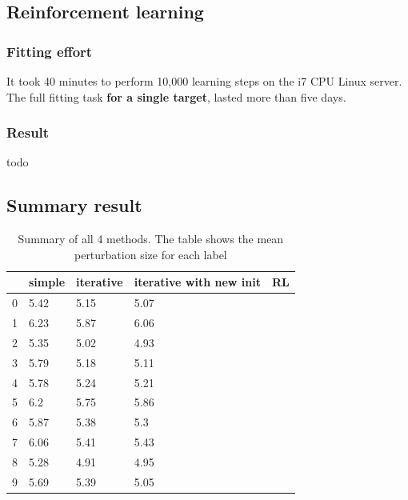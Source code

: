 \documentclass{article}
\begin{document}
\clearpage
\subsection{Reinforcement learning}

\subsubsection{Fitting effort}
It took 40 minutes to perform 10,000 learning steps on the i7 CPU Linux server.
The full fitting task \textbf{for a single target}, lasted more than five days.

\subsubsection{Result}
todo

\subsection{Summary result}

\begin{table}[h]
\caption{Summary of all 4 methods. The table shows the mean perturbation size for each label}
\label{tab:summary}
\begin{tabular}{|l|l|l|l|l|}
\hline
  & simple & iterative & iterative with new init & RL \\ \hline
0 & 5.42   & 5.15      & 5.07                    &    \\ \hline
1 & 6.23   & 5.87      & 6.06                    &    \\ \hline
2 & 5.35   & 5.02      & 4.93                    &    \\ \hline
3 & 5.79   & 5.18      & 5.11                    &    \\ \hline
4 & 5.78   & 5.24      & 5.21                    &    \\ \hline
5 & 6.2    & 5.75      & 5.86                    &    \\ \hline
6 & 5.87   & 5.38      & 5.3                     &    \\ \hline
7 & 6.06   & 5.41      & 5.43                    &    \\ \hline
8 & 5.28   & 4.91      & 4.95                    &    \\ \hline
9 & 5.69   & 5.39      & 5.05                    &    \\ \hline
\end{tabular}
\end{table}
\end{document}
